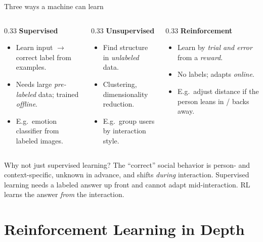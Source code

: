 \documentclass[aspectratio=169,10pt]{beamer}
\begin{document}
\begin{frame}{Three ways a machine can learn}
  \begin{columns}[T]
    \begin{column}{0.33\textwidth}
      \textbf{Supervised}
      \begin{itemize}\footnotesize
        \item Learn input $\to$ correct label from examples.
        \item Needs large \emph{pre-labeled} data; trained \emph{offline}.
        \item E.g.\ emotion classifier from labeled images.
      \end{itemize}
    \end{column}
    \begin{column}{0.33\textwidth}
      \textbf{Unsupervised}
      \begin{itemize}\footnotesize
        \item Find structure in \emph{unlabeled} data.
        \item Clustering, dimensionality reduction.
        \item E.g.\ group users by interaction style.
      \end{itemize}
    \end{column}
    \begin{column}{0.33\textwidth}
      \textbf{\alert{Reinforcement}}
      \begin{itemize}\footnotesize
        \item Learn by \emph{trial and error} from a \emph{reward}.
        \item No labels; adapts \emph{online}.
        \item E.g.\ adjust distance if the person leans in / backs away.
      \end{itemize}
    \end{column}
  \end{columns}
  \vspace{0.8em}
  \begin{alertblock}{Why not just supervised learning?}
    The ``correct'' social behavior is person- and context-specific, unknown in advance, and shifts \emph{during} interaction. Supervised learning needs a labeled answer up front and cannot adapt mid-interaction. RL learns the answer \emph{from} the interaction.
  \end{alertblock}
\end{frame}

\section{Reinforcement Learning in Depth}
\end{document}
